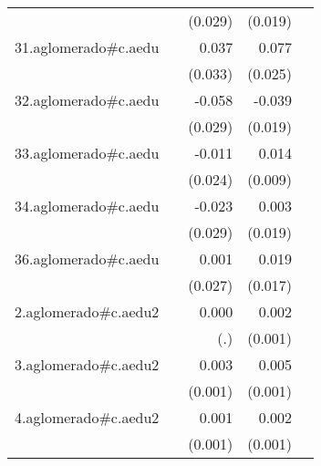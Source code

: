 {\begin{longtable}{l*{4}{D{.}{.}{-1}}}
            &                     &     (0.029)         &     (0.019)         &                     \\
\addlinespace
31.aglomerado#c.aedu&                     &       0.037         &       0.077\sym{**} &                     \\
            &                     &     (0.033)         &     (0.025)         &                     \\
\addlinespace
32.aglomerado#c.aedu&                     &      -0.058\sym{*}  &      -0.039\sym{*}  &                     \\
            &                     &     (0.029)         &     (0.019)         &                     \\
\addlinespace
33.aglomerado#c.aedu&                     &      -0.011         &       0.014         &                     \\
            &                     &     (0.024)         &     (0.009)         &                     \\
\addlinespace
34.aglomerado#c.aedu&                     &      -0.023         &       0.003         &                     \\
            &                     &     (0.029)         &     (0.019)         &                     \\
\addlinespace
36.aglomerado#c.aedu&                     &       0.001         &       0.019         &                     \\
            &                     &     (0.027)         &     (0.017)         &                     \\
\addlinespace
2.aglomerado#c.aedu2&                     &       0.000         &       0.002         &                     \\
            &                     &         (.)         &     (0.001)         &                     \\
\addlinespace
3.aglomerado#c.aedu2&                     &       0.003\sym{*}  &       0.005\sym{***}&                     \\
            &                     &     (0.001)         &     (0.001)         &                     \\
\addlinespace
4.aglomerado#c.aedu2&                     &       0.001         &       0.002\sym{***}&                     \\
            &                     &     (0.001)         &     (0.001)         &                     \\

\end{longtable}}
